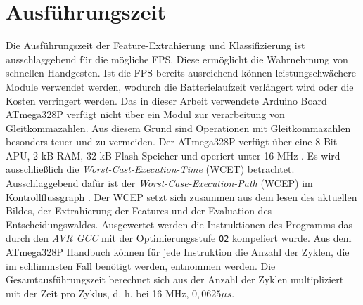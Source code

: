\section{Ausführungszeit}
Die Ausführungszeit der Feature-Extrahierung und Klassifizierung ist ausschlaggebend für die mögliche FPS. Diese ermöglicht die Wahrnehmung von schnellen Handgesten. Ist die FPS bereits ausreichend
können leistungschwächere Module verwendet werden, wodurch die Batterielaufzeit verlängert wird oder die Kosten verringert werden.
\newline
\newline
Das in dieser Arbeit verwendete Arduino Board ATmega328P verfügt nicht über ein Modul zur verarbeitung von Gleitkommazahlen. Aus diesem Grund sind Operationen mit Gleitkommazahlen besonders teuer
und zu vermeiden. Der ATmega328P verfügt über eine 8-Bit APU, 2 kB RAM, 32 kB Flash-Speicher und operiert unter 16 MHz \cite{atmega328p}.
\newline
\newline
Es wird ausschließlich die \textit{Worst-Cast-Execution-Time} (WCET) betrachtet. Ausschlaggebend dafür ist der \textit{Worst-Case-Execution-Path} (WCEP) im Kontrollflussgraph \cite{wcc_intro}. Der WCEP
setzt sich zusammen aus dem lesen des aktuellen Bildes, der Extrahierung der Features und der Evaluation des Entscheidungswaldes.
\newline
\newline
Ausgewertet werden die Instruktionen des Programms das durch den \textit{AVR GCC} mit der Optimierungsstufe \texttt{O2} kompeliert wurde. Aus dem ATmega328P Handbuch \cite{atmega328p} können
für jede Instruktion die Anzahl der Zyklen, die im schlimmsten Fall benötigt werden, entnommen werden. Die Gesamtausführungszeit berechnet sich aus der Anzahl der Zyklen multipliziert mit der Zeit
pro Zyklus, d. h. bei 16 MHz, $0,0625 \mu s$.



